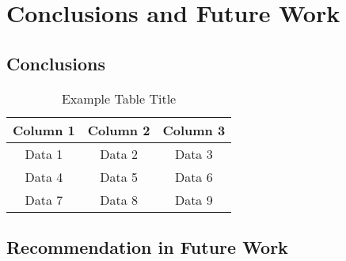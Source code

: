 \chapter{Conclusions and Future Work}

\begingroup
\raggedright
{}
\setlength{\parskip}{0.5\baselineskip}
\titlespacing{\chapter}{0pt}{0pt}{0pt}
\titlespacing{\section}{0pt}{0pt}{0pt}

\section{Conclusions}

\begin{table}[h]
    \centering
    \caption{Example Table Title}
    \label{tab:example}
    \begin{tabular}{|c|c|c|}
        \hline
        Column 1 & Column 2 & Column 3 \\ \hline
        Data 1   & Data 2   & Data 3   \\ \hline
        Data 4   & Data 5   & Data 6   \\ \hline
        Data 7   & Data 8   & Data 9   \\ \hline
    \end{tabular}
\end{table}

\section{Recommendation in Future Work}

\endgroup